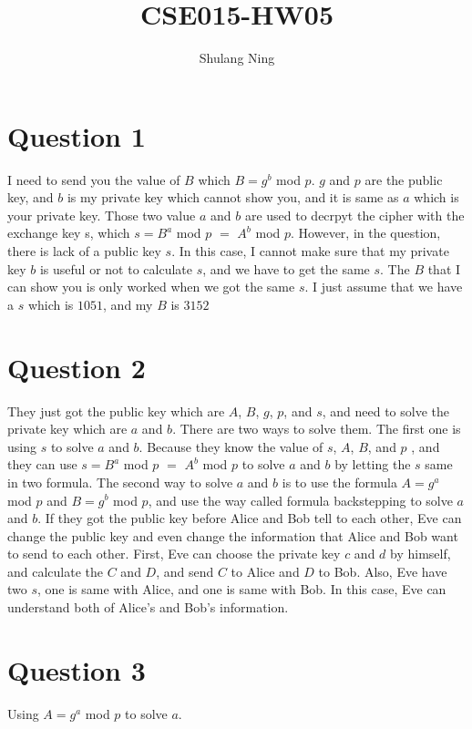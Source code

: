\documentclass[11pt]{article}
\title{CSE015-HW05}
\author{Shulang Ning}
\begin{document}
        
    \maketitle
    
    \section{Question 1}
        I need to send you the value of $B$ which $B = g^b$ mod $p$. $g$ and $p$ are the public key, and $b$ is my private key which cannot show you, and it is same as $a$ which is your private key. Those two value $a$ and $b$ are used to decrpyt the cipher with the exchange key s, which $s = B^a$ mod $p$ $=$ $A^b$ mod $p$. However, in the question, there is lack of a public key $s$. In this case, I cannot make sure that my private key $b$ is useful or not to calculate $s$, and we have to get the same $s$. The $B$ that I can show you is only worked when we got the same $s$. I just assume that we have a $s$ which is $1051$, and my $B$ is $3152$\\

    \section{Question 2}
        They just got the public key which are $A$, $B$, $g$, $p$, and $s$, and need to solve the private key which are $a$ and $b$. There are two ways to solve them. The first one is using $s$ to solve $a$ and $b$. Because they know the value of $s$, $A$, $B$, and $p$ , and they can use $s = B^a$ mod $p$ $=$ $A^b$ mod $p$ to solve $a$ and $b$ by letting the $s$ same in two formula. The second way to solve $a$ and $b$ is to use the formula $A = g^a$ mod $p$ and $B = g^b$ mod $p$, and use the way called formula backstepping to solve $a$ and $b$. If they got the public key before Alice and Bob tell to each other, Eve can change the public key and even change the information that Alice and Bob want to send to each other. First, Eve can choose the private key $c$ and $d$ by himself, and calculate the $C$ and $D$, and send $C$ to Alice and $D$ to Bob. Also, Eve have two $s$, one is same with Alice, and one is same with Bob. In this case, Eve can understand both of Alice's and Bob's information. \\
        
    \section{Question 3}
        Using $A = g^a$ mod $p$ to solve $a$.
\end{document}
